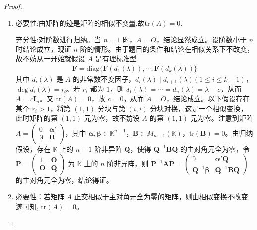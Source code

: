 \documentclass[../../main.tex]{subfiles}%
\begin{document}
\begin{proof}
\begin{enumerate}[(1)]
\item {\heiti 必要性:}由矩阵的迹是矩阵的相似不变量,故$\mathrm{tr}(A)=0$.

{\heiti 充分性:}对阶数进行归纳。当 $n = 1$ 时，$A = O$，结论显然成立。设阶数小于 $n$ 时结论成立，现证 $n$ 阶的情形。由于题目的条件和结论在相似关系下不改变，故不妨从一开始就假设 $A$ 是有理标准型
\begin{align*}
\boldsymbol{F}=\mathrm{diag}\{\boldsymbol{F}(d_1(\lambda)),\cdots,\boldsymbol{F}(d_k(\lambda))\}
\end{align*}
其中 $d_i(\lambda)$ 是 $A$ 的非常数不变因子，$d_i(\lambda)\mid d_{i + 1}(\lambda) (1\leqslant  i\leqslant  k - 1)$，$\deg d_i(\lambda)=r_i$。若 $r_i$ 都为 $1$，则 $d_1(\lambda)=\cdots = d_n(\lambda)=\lambda - c$，从而 $A = c\boldsymbol{I}_n$。又 $\mathrm{tr}(A)=0$，故 $c = 0$，从而 $A = O$，结论成立。以下假设存在某个 $r_i>1$，将第 $(1,1)$ 分块与第 $(i,i)$ 分块对换，这是一个相似变换，此时矩阵的第 $(1,1)$ 元为零，故不妨设 $A$ 的第 $(1,1)$ 元为零。注意到矩阵 $A=\begin{pmatrix}
0 & \boldsymbol{\alpha}' \\
\boldsymbol{\beta} & \boldsymbol{B}
\end{pmatrix}$，其中 $\boldsymbol{\alpha},\boldsymbol{\beta}\in\mathbb{K}^{n - 1}$，$\boldsymbol{B}\in M_{n - 1}(\mathbb{K})$，$\mathrm{tr}(\boldsymbol{B})=0$。由归纳假设，存在 $\mathbb{K}$ 上的 $n - 1$ 阶非异阵 $\boldsymbol{Q}$，使得 $\boldsymbol{Q}^{-1}\boldsymbol{B}\boldsymbol{Q}$ 的主对角元全为零，令 $\boldsymbol{P}=\begin{pmatrix}
1 & \boldsymbol{O} \\
\boldsymbol{O} & \boldsymbol{Q}
\end{pmatrix}$ 为 $\mathbb{K}$ 上的 $n$ 阶非异阵，则 $\boldsymbol{P}^{-1}\boldsymbol{A}\boldsymbol{P}=\begin{pmatrix}
0 & \boldsymbol{\alpha}'\boldsymbol{Q} \\
\boldsymbol{Q}^{-1}\boldsymbol{\beta} & \boldsymbol{Q}^{-1}\boldsymbol{B}\boldsymbol{Q}
\end{pmatrix}$ 的主对角元全为零，结论得证。

\item {\heiti 必要性：}若矩阵 \( A \) 正交相似于主对角元全为零的矩阵，则由相似变换不改变迹可知, \(\mathrm{tr}(A) = 0\)。


\end{enumerate}
\end{proof}
\end{document}
